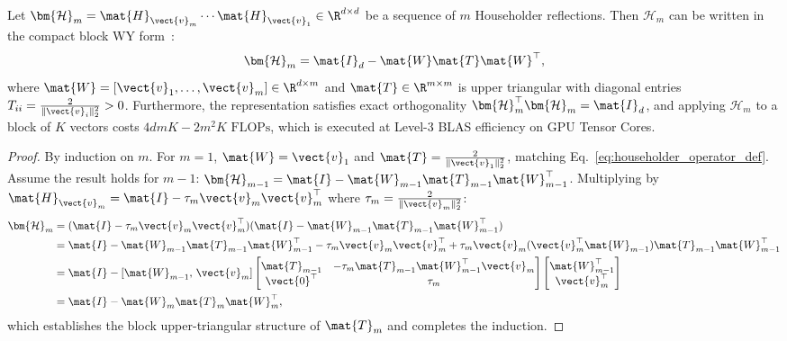 \begin{lemma}
\label{lem:wy_representation_householder}
Let $\bm{\mathcal{H}}_m = \mat{H}_{\vect{v}_m} \cdots \mat{H}_{\vect{v}_1} \in \R^{d \times d}$ be a sequence of $m$ Householder reflections.
Then $\bm{\mathcal{H}}_m$ can be written in the compact block WY form~\cite{golub2013matrix}:
\begin{equation}
\bm{\mathcal{H}}_m = \mat{I}_d - \mat{W} \mat{T} \mat{W}^\top,
\label{eq:wy_representation_def}
\end{equation}
where $\mat{W} = [\vect{v}_1, \dots, \vect{v}_m] \in \R^{d \times m}$ and $\mat{T} \in \R^{m \times m}$ is upper triangular with diagonal entries $T_{ii} = \frac{2}{\|\vect{v}_i\|_2^2} > 0$.
Furthermore, the representation satisfies exact orthogonality $\bm{\mathcal{H}}_m^\top \bm{\mathcal{H}}_m = \mat{I}_d$, and applying $\bm{\mathcal{H}}_m$ to a block of $K$ vectors costs $4 d m K - 2 m^2 K\text{ FLOPs}$, which is executed at Level-3 BLAS efficiency on GPU Tensor Cores.
\end{lemma}

\begin{proof}
By induction on $m$. For $m=1$, $\mat{W} = \vect{v}_1$ and $\mat{T} = \frac{2}{\|\vect{v}_1\|_2^2}$, matching Eq.~\eqref{eq:householder_operator_def}.
Assume the result holds for $m-1$: $\bm{\mathcal{H}}_{m-1} = \mat{I} - \mat{W}_{m-1} \mat{T}_{m-1} \mat{W}_{m-1}^\top$.
Multiplying by $\mat{H}_{\vect{v}_m} = \mat{I} - \tau_m \vect{v}_m \vect{v}_m^\top$ where $\tau_m = \frac{2}{\|\vect{v}_m\|_2^2}$:
\begin{align}
\bm{\mathcal{H}}_m &= (\mat{I} - \tau_m \vect{v}_m \vect{v}_m^\top) (\mat{I} - \mat{W}_{m-1} \mat{T}_{m-1} \mat{W}_{m-1}^\top) \nonumber \\
&= \mat{I} - \mat{W}_{m-1} \mat{T}_{m-1} \mat{W}_{m-1}^\top - \tau_m \vect{v}_m \vect{v}_m^\top + \tau_m \vect{v}_m (\vect{v}_m^\top \mat{W}_{m-1}) \mat{T}_{m-1} \mat{W}_{m-1}^\top \nonumber \\
&= \mat{I} - [\mat{W}_{m-1}, \, \vect{v}_m] \begin{bmatrix} \mat{T}_{m-1} & -\tau_m \mat{T}_{m-1} \mat{W}_{m-1}^\top \vect{v}_m \\ \vect{0}^\top & \tau_m \end{bmatrix} \begin{bmatrix} \mat{W}_{m-1}^\top \\ \vect{v}_m^\top \end{bmatrix} \nonumber \\
&= \mat{I} - \mat{W}_m \mat{T}_m \mat{W}_m^\top,
\end{align}
which establishes the block upper-triangular structure of $\mat{T}_m$ and completes the induction.
\end{proof}

